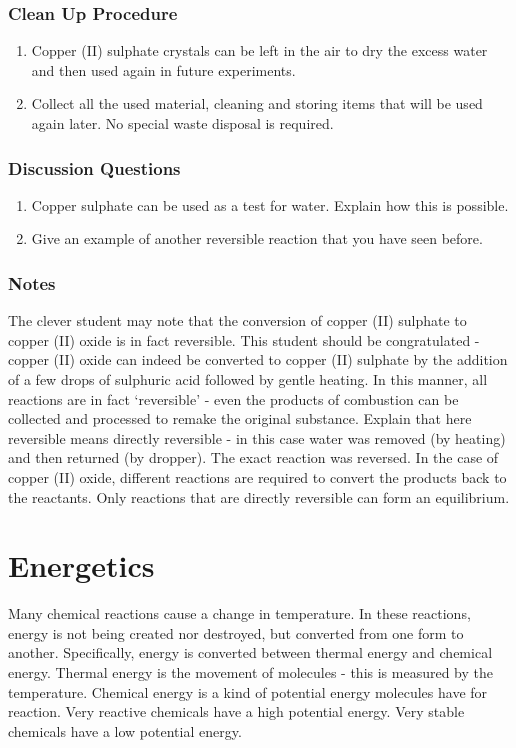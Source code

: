 \subsubsection*{Clean Up Procedure}
\begin{enumerate}
\item{Copper (II) sulphate crystals can be left in the air to dry the excess water and then used again in future experiments.}
\item{Collect all the used material, cleaning and storing items that will be used again later. No special waste disposal is required.}
\end{enumerate}

\subsubsection*{Discussion Questions}
\begin{enumerate}
\item{Copper sulphate can be used as a test for water. Explain how this is possible.}
\item{Give an example of another reversible reaction that you have seen before.}
\end{enumerate}

\subsubsection*{Notes}
The clever student may note that the conversion of copper (II) sulphate to copper (II) oxide is in fact reversible. This student should be congratulated - copper (II) oxide can indeed be converted to copper (II) sulphate by the addition of a few drops of sulphuric acid followed by gentle heating. In this manner, all reactions are in fact `reversible' - even the products of combustion can be collected and processed to remake the original substance. Explain that here reversible means directly reversible - in this case water was removed (by heating) and then returned (by dropper). The exact reaction was reversed. In the case of copper (II) oxide, different reactions are required to convert the products back to the reactants. Only reactions that are directly reversible can form an equilibrium.

\section{Energetics}

Many chemical reactions cause a change in temperature. In these reactions, energy is not being created nor destroyed, but converted from one form to another. Specifically, energy is converted between thermal energy and chemical energy. Thermal energy is the movement of molecules - this is measured by the temperature. Chemical energy is a kind of potential energy molecules have for reaction. Very reactive chemicals have a high potential energy. Very stable chemicals have a low potential energy.

